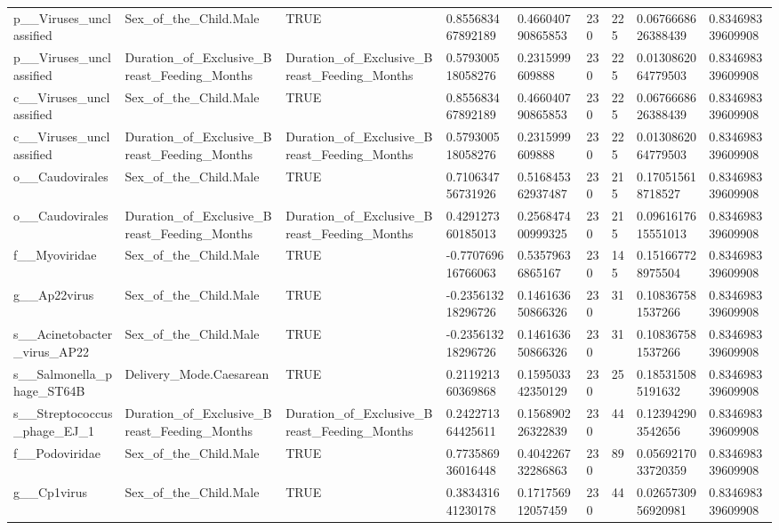 \begin{longtable}{lllllllll}
p\_\_Viruses\_unclassified & Sex\_of\_the\_Child.Male & TRUE & 0.855683467892189 & 0.466040790865853 & 230 & 225 & 0.0676668626388439 & 0.834698339609908 \\
p\_\_Viruses\_unclassified & Duration\_of\_Exclusive\_Breast\_Feeding\_Months & Duration\_of\_Exclusive\_Breast\_Feeding\_Months & 0.579300518058276 & 0.2315999609888 & 230 & 225 & 0.0130862064779503 & 0.834698339609908 \\
c\_\_Viruses\_unclassified & Sex\_of\_the\_Child.Male & TRUE & 0.855683467892189 & 0.466040790865853 & 230 & 225 & 0.0676668626388439 & 0.834698339609908 \\
c\_\_Viruses\_unclassified & Duration\_of\_Exclusive\_Breast\_Feeding\_Months & Duration\_of\_Exclusive\_Breast\_Feeding\_Months & 0.579300518058276 & 0.2315999609888 & 230 & 225 & 0.0130862064779503 & 0.834698339609908 \\
o\_\_Caudovirales & Sex\_of\_the\_Child.Male & TRUE & 0.710634756731926 & 0.516845362937487 & 230 & 215 & 0.170515618718527 & 0.834698339609908 \\
o\_\_Caudovirales & Duration\_of\_Exclusive\_Breast\_Feeding\_Months & Duration\_of\_Exclusive\_Breast\_Feeding\_Months & 0.429127360185013 & 0.256847400999325 & 230 & 215 & 0.0961617615551013 & 0.834698339609908 \\
f\_\_Myoviridae & Sex\_of\_the\_Child.Male & TRUE & -0.770769616766063 & 0.53579636865167 & 230 & 145 & 0.151667728975504 & 0.834698339609908 \\
g\_\_Ap22virus & Sex\_of\_the\_Child.Male & TRUE & -0.235613218296726 & 0.146163650866326 & 230 & 31 & 0.108367581537266 & 0.834698339609908 \\
s\_\_Acinetobacter\_virus\_AP22 & Sex\_of\_the\_Child.Male & TRUE & -0.235613218296726 & 0.146163650866326 & 230 & 31 & 0.108367581537266 & 0.834698339609908 \\
s\_\_Salmonella\_phage\_ST64B & Delivery\_Mode.Caesarean & TRUE & 0.211921360369868 & 0.159503342350129 & 230 & 25 & 0.185315085191632 & 0.834698339609908 \\
s\_\_Streptococcus\_phage\_EJ\_1 & Duration\_of\_Exclusive\_Breast\_Feeding\_Months & Duration\_of\_Exclusive\_Breast\_Feeding\_Months & 0.242271364425611 & 0.156890226322839 & 230 & 44 & 0.123942903542656 & 0.834698339609908 \\
f\_\_Podoviridae & Sex\_of\_the\_Child.Male & TRUE & 0.773586936016448 & 0.404226732286863 & 230 & 89 & 0.0569217033720359 & 0.834698339609908 \\
g\_\_Cp1virus & Sex\_of\_the\_Child.Male & TRUE & 0.383431641230178 & 0.171756912057459 & 230 & 44 & 0.0265730956920981 & 0.834698339609908 \\

\end{longtable}
